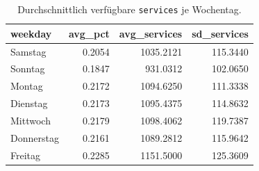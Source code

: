 \begin{table}[ht]
\centering
\begin{tabular}{lrrr}
  \hline
weekday & avg\_pct & avg\_services & sd\_services \\ 
  \hline
Samstag & 0.2054 & 1035.2121 & 115.3440 \\ 
  Sonntag & 0.1847 & 931.0312 & 102.0650 \\ 
  Montag & 0.2172 & 1094.6250 & 111.3338 \\ 
  Dienstag & 0.2173 & 1095.4375 & 114.8632 \\ 
  Mittwoch & 0.2179 & 1098.4062 & 119.7387 \\ 
  Donnerstag & 0.2161 & 1089.2812 & 115.9642 \\ 
  Freitag & 0.2285 & 1151.5000 & 125.3609 \\ 
   \hline
\end{tabular}
\caption{Durchschnittlich verfügbare \texttt{services} je Wochentag.} 
\label{activeservicesweek}
\end{table}
